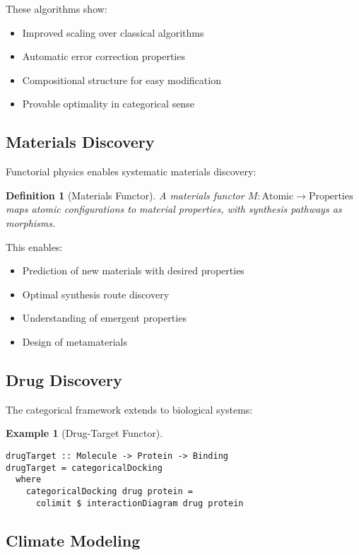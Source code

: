 \documentclass[11pt,a4paper]{article}
\newtheorem{definition}[theorem]{Definition}
\newtheorem{example}[theorem]{Example}
\begin{document}
These algorithms show:
\begin{itemize}
    \item Improved scaling over classical algorithms
    \item Automatic error correction properties
    \item Compositional structure for easy modification
    \item Provable optimality in categorical sense
\end{itemize}

\subsection{Materials Discovery}

Functorial physics enables systematic materials discovery:

\begin{definition}[Materials Functor]
A materials functor $M: \text{Atomic} \rightarrow \text{Properties}$ maps atomic configurations to material properties, with synthesis pathways as morphisms.
\end{definition}

This enables:
\begin{itemize}
    \item Prediction of new materials with desired properties
    \item Optimal synthesis route discovery
    \item Understanding of emergent properties
    \item Design of metamaterials
\end{itemize}

\subsection{Drug Discovery}

The categorical framework extends to biological systems:

\begin{example}[Drug-Target Functor]
\begin{lstlisting}
drugTarget :: Molecule -> Protein -> Binding
drugTarget = categoricalDocking
  where
    categoricalDocking drug protein =
      colimit $ interactionDiagram drug protein
\end{lstlisting}
\end{example}

\subsection{Climate Modeling}
\end{document}
